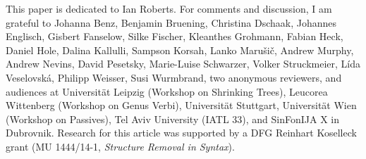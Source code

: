 \documentclass[output=paper]{langsci/langscibook}
\begin{document}
This paper is dedicated to Ian Roberts.  For comments and discussion, I am
grateful to  Johanna Benz, Benjamin Bruening, Christina Dschaak, Johannes
Eng\-lisch, Gisbert Fanselow, Silke Fischer, Kleanthes Grohmann, Fabian Heck,
Daniel Hole, Dalina Kallulli, Sampson Korsah,  Lanko Maru\v{s}i\v{c}, Andrew
Murphy,  Andrew Nevins, David Pesetsky, Marie-Luise Schwarzer, Volker
Struckmeier,  L\'ida Veselovsk\'a,   Philipp Weisser, Susi Wurmbrand, two
anonymous reviewers, and audiences at Universit{\"a}t Leipzig (Workshop on
Shrinking Trees), Leucorea Wittenberg (Workshop on Genus Verbi),
Universit{\"a}t Stuttgart, Universität Wien (Workshop on Passives), Tel Aviv
University (IATL 33), and SinFonIJA X in Dubrovnik.  Research for this article
was supported by a DFG Reinhart Koselleck grant (MU 1444/14-1, {\it Structure
Removal in Syntax}).

{\sloppy
\printbibliography[heading=subbibliography,notkeyword=this]
}
\end{document}
